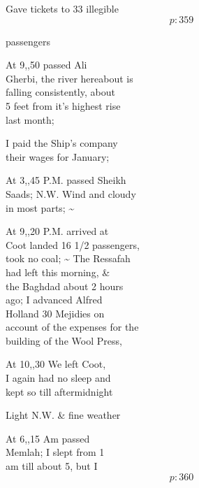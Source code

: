 \documentclass{report}
\begin{document}
	\par{
 	Gave tickets to 33 \lbrack illegible\rbrack\ \\
  \[p: 359 \]

	}


	\par{
 	passengers\ \\
	}

	\par{
 	At 9,,50 passed Ali\ \\Gherbi, the river hereabout is\ \\falling consistently, about\ \\5 feet from it's highest rise\ \\last month;\ \\
	}

	\par{
 	I paid the Ship's company\ \\their wages for January;\ \\
	}

	\par{
 	At 3,,45 P.M. passed Sheikh\ \\Saads; N.W. Wind and cloudy\ \\in most parts; \~{}\ \\
	}

	\par{
 	At 9,,20 P.M. arrived at\ \\Coot landed 16 1/2 passengers,\ \\took no coal; \~{} The Ressafah\ \\had left this morning, \&\ \\the Baghdad about 2 hours\ \\ago; I advanced Alfred\ \\Holland 30 Mejidies on\ \\account of the expenses for the\ \\building of the Wool Press,\ \\
	}

	\par{
 	At 10,,30 We left Coot,\ \\I again had no sleep and\ \\kept so till aftermidnight\ \\
	}

	\par{
 	Light N.W. \& fine weather\ \\
	}

	\par{
 	At 6,,15 Am passed\ \\Memlah; I slept from 1\ \\am till about 5, but I\ \\
  \[p: 360 \]

	}
\end{document}
